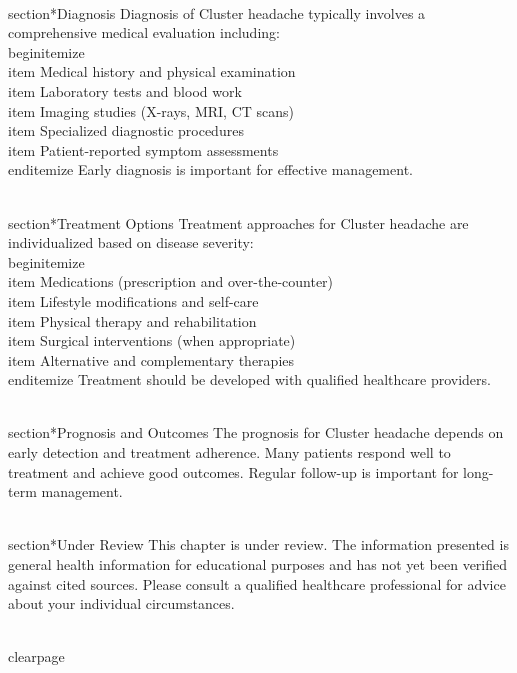 \\section*{Diagnosis}
Diagnosis of Cluster headache typically involves a comprehensive medical evaluation including:
\\begin{itemize}
  \\item Medical history and physical examination
  \\item Laboratory tests and blood work
  \\item Imaging studies (X-rays, MRI, CT scans)
  \\item Specialized diagnostic procedures
  \\item Patient-reported symptom assessments
\\end{itemize}
Early diagnosis is important for effective management.

\\section*{Treatment Options}
Treatment approaches for Cluster headache are individualized based on disease severity:
\\begin{itemize}
  \\item Medications (prescription and over-the-counter)
  \\item Lifestyle modifications and self-care
  \\item Physical therapy and rehabilitation
  \\item Surgical interventions (when appropriate)
  \\item Alternative and complementary therapies
\\end{itemize}
Treatment should be developed with qualified healthcare providers.

\\section*{Prognosis and Outcomes}
The prognosis for Cluster headache depends on early detection and treatment adherence. Many patients respond well to treatment and achieve good outcomes. Regular follow-up is important for long-term management.

\\section*{Under Review}
This chapter is under review. The information presented is general health information for educational purposes and has not yet been verified against cited sources. Please consult a qualified healthcare professional for advice about your individual circumstances.

\\clearpage
